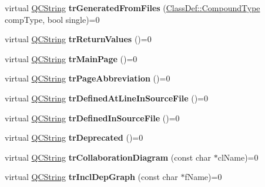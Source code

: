 \begin{DoxyCompactItemize}
\item 
\hypertarget{class_translator_a97f9b79af8da1510a8c449c2cdeb6df0}{virtual \hyperlink{class_q_c_string}{Q\-C\-String} {\bfseries tr\-Generated\-From\-Files} (\hyperlink{class_class_def_a768a6f0a6fd7e9087ff7971abbcc3f36}{Class\-Def\-::\-Compound\-Type} comp\-Type, bool single)=0}\label{class_translator_a97f9b79af8da1510a8c449c2cdeb6df0}

\item 
\hypertarget{class_translator_a04d3c35e204e7be1c4d8f0b314d022a3}{virtual \hyperlink{class_q_c_string}{Q\-C\-String} {\bfseries tr\-Return\-Values} ()=0}\label{class_translator_a04d3c35e204e7be1c4d8f0b314d022a3}

\item 
\hypertarget{class_translator_aaf0ff2a2c07c73166cfbefd7f820c291}{virtual \hyperlink{class_q_c_string}{Q\-C\-String} {\bfseries tr\-Main\-Page} ()=0}\label{class_translator_aaf0ff2a2c07c73166cfbefd7f820c291}

\item 
\hypertarget{class_translator_a27618a1695aa546f430941bff9affe87}{virtual \hyperlink{class_q_c_string}{Q\-C\-String} {\bfseries tr\-Page\-Abbreviation} ()=0}\label{class_translator_a27618a1695aa546f430941bff9affe87}

\item 
\hypertarget{class_translator_ae2174eae8342d031bf40ae77b731a244}{virtual \hyperlink{class_q_c_string}{Q\-C\-String} {\bfseries tr\-Defined\-At\-Line\-In\-Source\-File} ()=0}\label{class_translator_ae2174eae8342d031bf40ae77b731a244}

\item 
\hypertarget{class_translator_a82a2027368b675fe331ba959598e908e}{virtual \hyperlink{class_q_c_string}{Q\-C\-String} {\bfseries tr\-Defined\-In\-Source\-File} ()=0}\label{class_translator_a82a2027368b675fe331ba959598e908e}

\item 
\hypertarget{class_translator_a472ee44bc9588d014c039c2afd4e5e06}{virtual \hyperlink{class_q_c_string}{Q\-C\-String} {\bfseries tr\-Deprecated} ()=0}\label{class_translator_a472ee44bc9588d014c039c2afd4e5e06}

\item 
\hypertarget{class_translator_a09d47dbd032d331b41efc957b2eb3812}{virtual \hyperlink{class_q_c_string}{Q\-C\-String} {\bfseries tr\-Collaboration\-Diagram} (const char $\ast$cl\-Name)=0}\label{class_translator_a09d47dbd032d331b41efc957b2eb3812}

\item 
\hypertarget{class_translator_a5e577b4ea1441c3b173ada38e60557ae}{virtual \hyperlink{class_q_c_string}{Q\-C\-String} {\bfseries tr\-Incl\-Dep\-Graph} (const char $\ast$f\-Name)=0}\label{class_translator_a5e577b4ea1441c3b173ada38e60557ae}


\end{DoxyCompactItemize}
